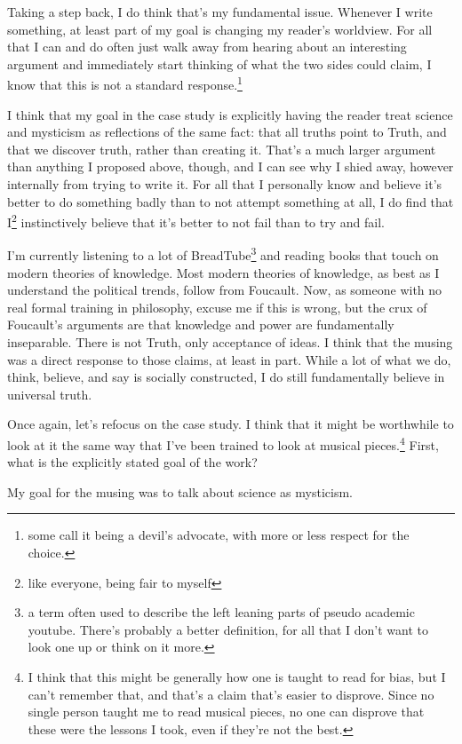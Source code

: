 \documentclass[12pt]{article}[titlepage]
\newcommand{\1}{\={a}}
\newcommand{\2}{\={e}}
\newcommand{\3}{\={\i}}
\newcommand{\4}{\=o}
\newcommand{\5}{\=u}
\newcommand{\6}{\={A}}
\renewcommand{\,}{\textsuperscript{,}}
\begin{document}
Taking a step back, I do think that's my fundamental issue.
Whenever I write something, at least part of my goal is changing my reader's worldview.
For all that I can and do often just walk away from hearing about an interesting argument and immediately start thinking of what the two sides could claim, I know that this is not a standard response.\footnote{some call it being a devil's advocate, with more or less respect for the choice.}

I think that my goal in the case study is explicitly having the reader treat science and mysticism as reflections of the same fact: that all truths point to Truth, and that we discover truth, rather than creating it.
That's a much larger argument than anything I proposed above, though, and I can see why I shied away, however internally from trying to write it.
For all that I personally know and believe it's better to do something badly than to not attempt something at all, I do find that I\footnote{like everyone, being fair to myself} instinctively believe that it's better to not fail than to try and fail.

I'm currently listening to a lot of BreadTube\footnote{a term often used to describe the left leaning parts of pseudo academic youtube. There's probably a better definition, for all that I don't want to look one up or think on it more.} and reading books that touch on modern theories of knowledge.
Most modern theories of knowledge, as best as I understand the political trends, follow from Foucault.
Now, as someone with no real formal training in philosophy, excuse me if this is wrong, but the crux of Foucault's arguments are that knowledge and power are fundamentally inseparable.
There is not Truth, only acceptance of ideas.
I think that the musing was a direct response to those claims, at least in part.
While a lot of what we do, think, believe, and say is socially constructed, I do still fundamentally believe in universal truth.

Once again, let's refocus on the case study.
I think that it might be worthwhile to look at it the same way that I've been trained to look at musical pieces.\footnote{I think that this might be generally how one is taught to read for bias, but I can't remember that, and that's a claim that's easier to disprove.
Since no single person taught me to read musical pieces, no one can disprove that these were the lessons I took, even if they're not the best.}
First, what is the explicitly stated goal of the work?

My goal for the musing was to talk about science as mysticism.
\end{document}
